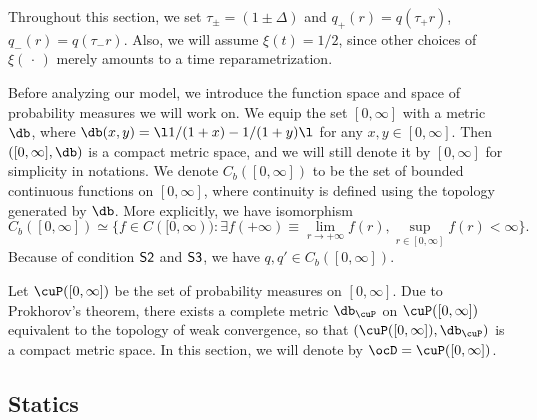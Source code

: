 \documentclass[11pt]{article}
\begin{document}
Throughout this section, we set $\tau_{\pm} = (1\pm \Delta)$ and $q_+(r) = q(\tau_+r)$, $q_-(r) = q(\tau_-r)$. Also, we will assume $\xi(t)=1/2$, since other choices of $\xi(\,\cdot\,)$ merely amounts to a time reparametrization. 



Before analyzing our model, we introduce the function space and space of probability measures we will work on. We equip the set $[0, \infty]$ with a metric $\db$, where $\db(x, y) = \l 1/(1 + x ) - 1/(1 + y) \l$ for any $x, y \in [0, \infty]$. 
Then $([0, \infty], \db)$ is a compact metric space, and we will still denote it by $[0, \infty]$ for simplicity in notations. We denote $C_b([0, \infty])$ to be the set of bounded continuous functions on $[0, \infty]$, where continuity is defined using the topology generated by $\db$. More explicitly, we have isomorphism
\begin{equation}
C_b([0, \infty]) \simeq \{ f \in C([0, \infty)): \exists f(+\infty) \equiv \lim_{r \to +\infty} f(r),  \sup_{r \in [0, \infty]} f(r) < \infty \}. 
\end{equation}
Because of condition ${\sf S2}$ and ${\sf S3}$, we have $q, q' \in C_b([0, \infty])$. 

Let $\cuP([0, \infty])$ be the set of probability measures on $[0, \infty]$. Due to Prokhorov's theorem, there exists a complete metric $\db_\cuP$ on $\cuP([0, \infty])$ equivalent to the topology of weak convergence, so that $(\cuP([0, \infty]), \db_\cuP)$ is a compact metric space. In this section, we will denote by $\ocD = \cuP([0, \infty])$. 

\subsection{Statics}
\end{document}
